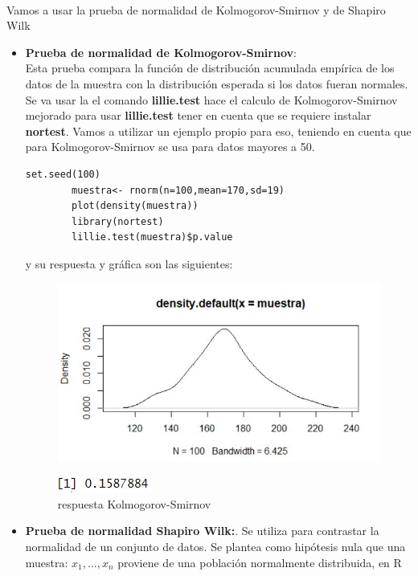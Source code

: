 \documentclass[12pt,hidelinks]{article}
\begin{document}
\paragraph{}Vamos a usar la prueba de normalidad de Kolmogorov-Smirnov y de Shapiro Wilk
\begin{itemize}
	\item \textbf{Prueba de normalidad de Kolmogorov-Smirnov}:\\
	Esta prueba compara la función de distribución acumulada empírica de los datos de la muestra con la distribución esperada si los datos fueran normales. Se va usar la el comando \textbf{lillie.test} hace el calculo de Kolmogorov-Smirnov mejorado para usar \textbf{lillie.test} tener en cuenta que se requiere instalar \textbf{nortest}. Vamos a utilizar un ejemplo propio para eso, teniendo en cuenta que para Kolmogorov-Smirnov se usa para datos mayores a 50.
	\begin{lstlisting}[frame=single]
		set.seed(100)
		muestra<- rnorm(n=100,mean=170,sd=19)
		plot(density(muestra))
		library(nortest)
		lillie.test(muestra)$p.value
	\end{lstlisting}
	y su respuesta y gráfica son las siguientes:
	\begin{figure}[h!]
		\centering
		\includegraphics[width=0.9\linewidth]{images/3/ks_grafica1.jpeg}
	\end{figure}
	\begin{figure}[h!]
		\centering
		\includegraphics[width=0.4\linewidth]{images/3/ks1.JPG}
		\caption{respuesta Kolmogorov-Smirnov}
	\end{figure}
	\item \textbf{Prueba de normalidad Shapiro Wilk:}. Se utiliza para contrastar la normalidad de un conjunto de datos. Se plantea como hipótesis nula que una muestra: $x_1,...,x_n$ proviene de una población normalmente distribuida, en R

\end{itemize}
\end{document}

